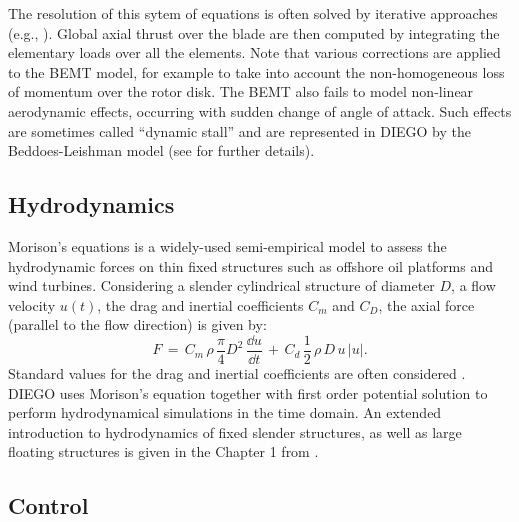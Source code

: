 The resolution of this sytem of equations is often solved by iterative approaches (e.g., \cite{dai_2011_BEMT}). 
Global axial thrust over the blade are then computed by integrating the elementary loads over all the elements. 
Note that various corrections are applied to the BEMT model, for example to take into account the non-homogeneous loss of momentum over the rotor disk. 
The BEMT also fails to model non-linear aerodynamic effects, occurring with sudden change of angle of attack. 
Such effects are sometimes called ``dynamic stall'' and are represented in DIEGO by the Beddoes-Leishman model (see \citet{burton_2021_wind_handbook} for further details).  


\subsection{Hydrodynamics}

Morison's equations is a widely-used semi-empirical model to assess the hydrodynamic forces on thin fixed structures such as offshore oil platforms and wind turbines. 
Considering a slender cylindrical structure of diameter $D$, a flow velocity $u(t)$, the drag and inertial coefficients $C_m$ and $C_D$, the axial force (parallel to the flow direction) is given by:   
\begin{equation}
    F\,=\,C_{m}\,\rho \,{\frac {\pi }{4}}D^{2}\,{\frac{\dd u}{\dd t}}\,+\,C_{d}\,{\frac 12}\,\rho \,D\,u\,|u|.
\end{equation}
Standard values for the drag and inertial coefficients are often considered \citep{dnv_2013_offshore_design}. 
DIEGO uses Morison’s equation together with first order potential solution to perform hydrodynamical simulations in the time domain.
An extended introduction to hydrodynamics of fixed slender structures, as well as large floating structures is given in the Chapter 1 from \citep{milano_thesis_2021}.  

\subsection{Control}

